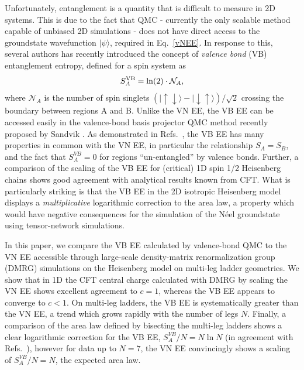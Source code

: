 \documentclass[prl,aps,twocolumn,floatfix,amsmath,amssymb,superscriptaddress,tightenlines]{revtex4}
\begin{document}
Unfortunately, entanglement is a quantity that is difficult to
measure in 2D systems.  This is due to the fact that QMC - currently the
only scalable method capable of unbiased 2D simulations - does not have
direct access to the groundstate wavefunction $| \psi \rangle$, required
in Eq.~\eqref{vNEE}.  In response to this, several authors \cite{Alet,
Chh} has recently introduced the concept of {\it valence bond} (VB)
entanglement entropy, defined for a  spin system as
\begin{equation} 
S^{\rm VB}_A = \ln(2) \cdot \mathcal{N}_A, \label{VBEE}
\end{equation} 
where $ \mathcal{N}_A$ is the number of spin singlets
${( |\uparrow \downarrow \rangle - | \downarrow \uparrow
\rangle)/\sqrt{2}}$ crossing the boundary between regions A and B.  Unlike
the VN EE, the VB EE can be accessed easily in the valence-bond basis
projector QMC method recently proposed by Sandvik \cite{Sandvik}.  As
demonstrated in Refs.~\cite{Alet,Chh}, the VB EE has many properties in
common with the VN EE, in particular the relationship $S_A = S_B$, and the
fact that $S^{VB}_A=0$ for regions ``un-entangled'' by valence bonds.
Further, a comparison of the scaling of the VB EE for (critical) 1D spin
1/2 Heisenberg chains shows good agreement with analytical results known
from CFT.  What is
particularly striking \cite{Alet,Chh} is that the VB EE in the
 2D isotropic Heisenberg model
displays a {\it multiplicative} logarithmic correction to the area law, a property
which would have negative consequences for the simulation of the 
N\'eel groundstate using tensor-network simulations.

 
In this paper, we compare the VB EE calculated by valence-bond QMC to the
VN EE accessible through large-scale density-matrix renormalization group
(DMRG) simulations on the Heisenberg model on multi-leg ladder
geometries.    We show that in 1D the CFT central charge calculated with DMRG by scaling the
VN EE shows excellent agreement to $c=1$, whereas the VB EE appears to converge
to $c<1$.
On multi-leg
ladders, the VB EE is systematically greater than the VN EE,
a trend which grows rapidly with the number of legs $N$.  Finally, a
comparison of the area law defined by bisecting the multi-leg ladders
shows a clear logarithmic correction for the VB EE, $S^{VB}_A /N = N \ln
N$ (in agreement with Refs.~\cite{Alet,Chh}), however for data up to
$N=7$, the VN EE convincingly shows a scaling of
$S^{VB}_A /N = N$, the expected area law.
\end{document}
